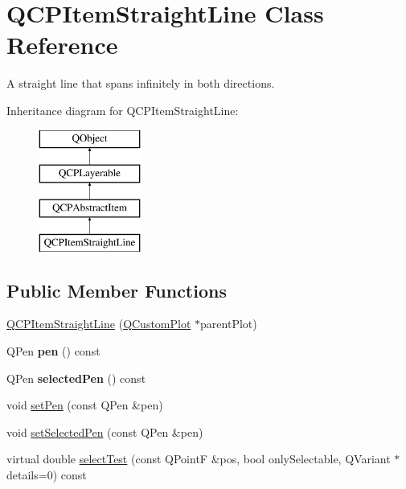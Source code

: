 \hypertarget{classQCPItemStraightLine}{}\section{Q\+C\+P\+Item\+Straight\+Line Class Reference}
\label{classQCPItemStraightLine}


A straight line that spans infinitely in both directions.  


Inheritance diagram for Q\+C\+P\+Item\+Straight\+Line\+:\begin{figure}[H]
\begin{center}
\leavevmode
\includegraphics[height=4.000000cm]{classQCPItemStraightLine}
\end{center}
\end{figure}
\subsection*{Public Member Functions}
\begin{DoxyCompactItemize}
\item 
\hyperlink{classQCPItemStraightLine_a41fd2e1f006983449eca9830930c3b10}{Q\+C\+P\+Item\+Straight\+Line} (\hyperlink{classQCustomPlot}{Q\+Custom\+Plot} $\ast$parent\+Plot)
\item 
\hypertarget{classQCPItemStraightLine_ad858ab1a444391aab778f765453ea222}{}Q\+Pen {\bfseries pen} () const \label{classQCPItemStraightLine_ad858ab1a444391aab778f765453ea222}

\item 
\hypertarget{classQCPItemStraightLine_a9e33ae966a7e2ea1083b3b9aeabeaea5}{}Q\+Pen {\bfseries selected\+Pen} () const \label{classQCPItemStraightLine_a9e33ae966a7e2ea1083b3b9aeabeaea5}

\item 
void \hyperlink{classQCPItemStraightLine_a9f36c9c9e60d7d9ac084c80380ac8601}{set\+Pen} (const Q\+Pen \&pen)
\item 
void \hyperlink{classQCPItemStraightLine_a5c33559498d33543fa95cf0a36e851ff}{set\+Selected\+Pen} (const Q\+Pen \&pen)
\item 
virtual double \hyperlink{classQCPItemStraightLine_a64cc3796f58ce856012732603edb2f1c}{select\+Test} (const Q\+Point\+F \&pos, bool only\+Selectable, Q\+Variant $\ast$details=0) const 
\end{DoxyCompactItemize}
